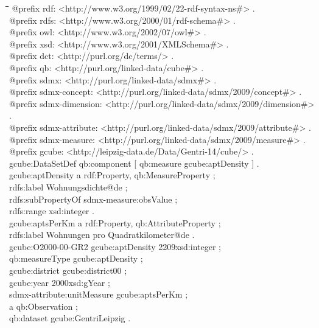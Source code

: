 \documentclass[a4paper,11pt]{article}
\newenvironment{code}{\tt \begin{tabbing}
\hskip12pt\=\hskip12pt\=\hskip12pt\=\hskip12pt\=\hskip5cm\=\hskip5cm\=\kill}
{\end{tabbing}}
\def\ppw{{\char94\char94}}
\begin{document}
\begin{code}
@prefix rdf:            <http://www.w3.org/1999/02/22-rdf-syntax-ns\#> .\\
@prefix rdfs:           <http://www.w3.org/2000/01/rdf-schema\#> .\\
@prefix owl:            <http://www.w3.org/2002/07/owl\#> .\\
@prefix xsd:            <http://www.w3.org/2001/XMLSchema\#> .\\
@prefix dct:             <http://purl.org/dc/terms/> .\\
@prefix qb:             <http://purl.org/linked-data/cube\#> .\\
@prefix sdmx:           <http://purl.org/linked-data/sdmx\#> .\\
@prefix sdmx-concept:   <http://purl.org/linked-data/sdmx/2009/concept\#> .\\
@prefix sdmx-dimension: <http://purl.org/linked-data/sdmx/2009/dimension\#> .\\
@prefix sdmx-attribute: <http://purl.org/linked-data/sdmx/2009/attribute\#> .\\
@prefix sdmx-measure:   <http://purl.org/linked-data/sdmx/2009/measure\#> .\\
@prefix gcube:          <http://leipzig-data.de/Data/Gentri-14/cube/> .\\[6pt]

gcube:DataSetDef qb:component [ qb:measure gcube:aptDensity ] .\\[6pt]

gcube:aptDensity a rdf:Property, qb:MeasureProperty ;\+\\
    rdfs:label {\dq}Wohnungsdichte{\dq}@de ;\\
    rdfs:subPropertyOf sdmx-measure:obsValue ;\\
    rdfs:range xsd:integer .\-\\[6pt]

gcube:aptsPerKm a rdf:Property, qb:AttributeProperty ;\+\\
    rdfs:label {\dq}Wohnungen pro Quadratkilometer{\dq}@de .\-\\[6pt]

gcube:O2000-00-GR2 gcube:aptDensity {\dq}2209{\dq}{\ppw}xsd:integer ;\+\\
    qb:measureType gcube:aptDensity ;\\
    gcube:district gcube:district00 ;\\
    gcube:year {\dq}2000{\dq}{\ppw}xsd:gYear ;\\
    sdmx-attribute:unitMeasure gcube:aptsPerKm ;\\
    a qb:Observation ;\\
    qb:dataset gcube:GentriLeipzig .\-\\[6pt]


\end{code}
\end{document}
